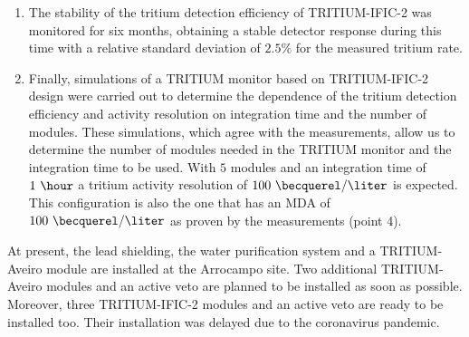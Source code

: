 \begin{enumerate}
\item{} The stability of the tritium detection efficiency of TRITIUM-IFIC-2 was monitored for six months, obtaining a stable detector response during this time with a relative standard deviation of $2.5\%$ for the measured tritium rate. 

\item{} Finally, simulations of a TRITIUM monitor based on TRITIUM-IFIC-2 design were carried out to determine the dependence of the tritium detection efficiency and activity resolution on integration time and the number of modules. These simulations, which agree with the measurements, allow us to determine the number of modules needed in the TRITIUM monitor and the integration time to be used. With $5$ modules and an integration time of $1~\hour$ a tritium activity resolution of $100~\becquerel/\liter$ is expected. This configuration is also the one that has an MDA of $100~\becquerel/\liter$ as proven by the measurements (point 4).

\end{enumerate}

At present, the lead shielding, the water purification system and a TRITIUM-Aveiro module are installed at the Arrocampo site. Two additional TRITIUM-Aveiro modules and an active veto are planned to be installed as soon as possible. Moreover, three TRITIUM-IFIC-2 modules and an active veto are ready to be installed too. Their installation was delayed due to the coronavirus pandemic.